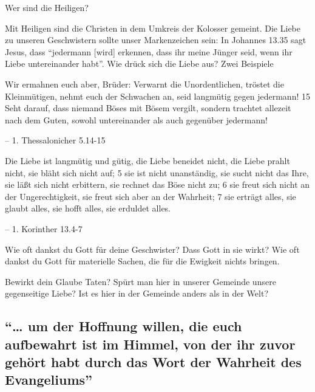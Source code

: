 \documentclass[
  12pt,
]{krantz}
\makeatletter
\newenvironment{kframe}{%
\medskip{}
\setlength{\fboxsep}{.8em}
 \def\at@end@of@kframe{}%
 \ifinner\ifhmode%
  \def\at@end@of@kframe{\end{minipage}}%
  \begin{minipage}{\columnwidth}%
 \fi\fi%
 \def\FrameCommand##1{\hskip\@totalleftmargin \hskip-\fboxsep
 \colorbox{shadecolor}{##1}\hskip-\fboxsep
     \hskip-\linewidth \hskip-\@totalleftmargin \hskip\columnwidth}%
 \MakeFramed {\advance\hsize-\width
   \@totalleftmargin\z@ \linewidth\hsize
   \@setminipage}}%
 {\par\unskip\endMakeFramed%
 \at@end@of@kframe}
\newenvironment{rmdblock}[1]
  {
  \begin{itemize}
  \renewcommand{\labelitemi}{
    \raisebox{-.7\height}[0pt][0pt]{
      {\setkeys{Gin}{width=3em,keepaspectratio}\texttt{[image: img/\#1]}}
    }
  }
  \setlength{\fboxsep}{1em}
  \begin{kframe}
  \item
  }
  {
  \end{kframe}
  \end{itemize}
  }
\newenvironment{rmdquestion}
  {\begin{rmdblock}{question}}
  {\end{rmdblock}}
\newenvironment{rmdquote}
  {\begin{rmdblock}{quote}}
  {\end{rmdblock}}
\makeatother
\begin{document}
Wer sind die Heiligen?

Mit Heiligen sind die Christen in dem Umkreis der Kolosser gemeint. Die Liebe zu unseren Geschwistern sollte unser Markenzeichen sein: In Johannes 13.35 sagt Jesus, dass ``jedermann {[}wird{]} erkennen, dass ihr meine Jünger seid, wenn ihr Liebe untereinander habt''. Wie drück sich die Liebe aus? Zwei Beispiele

\begin{rmdquote}
Wir ermahnen euch aber, Brüder: Verwarnt die Unordentlichen, tröstet die
Kleinmütigen, nehmt euch der Schwachen an, seid langmütig gegen
jedermann! 15 Seht darauf, dass niemand Böses mit Bösem vergilt, sondern
trachtet allezeit nach dem Guten, sowohl untereinander als auch
gegenüber jedermann!

-- 1. Thessalonicher 5.14-15
\end{rmdquote}

\begin{rmdquote}
Die Liebe ist langmütig und gütig, die Liebe beneidet nicht, die Liebe
prahlt nicht, sie bläht sich nicht auf; 5 sie ist nicht unanständig, sie
sucht nicht das Ihre, sie läßt sich nicht erbittern, sie rechnet das
Böse nicht zu; 6 sie freut sich nicht an der Ungerechtigkeit, sie freut
sich aber an der Wahrheit; 7 sie erträgt alles, sie glaubt alles, sie
hofft alles, sie erduldet alles.

-- 1. Korinther 13.4-7
\end{rmdquote}

\begin{rmdquestion}
Wie oft dankst du Gott für deine Geschwister? Dass Gott in sie wirkt?
Wie oft dankst du Gott für materielle Sachen, die für die Ewigkeit
nichts bringen.

Bewirkt dein Glaube Taten? Spürt man hier in unserer Gemeinde unsere
gegenseitige Liebe? Ist es hier in der Gemeinde anders als in der Welt?
\end{rmdquestion}

\hypertarget{um-der-hoffnung-willen-die-euch-aufbewahrt-ist-im-himmel-von-der-ihr-zuvor-gehuxf6rt-habt-durch-das-wort-der-wahrheit-des-evangeliums}{%
\subsection{``\ldots{} um der Hoffnung willen, die euch aufbewahrt ist im Himmel, von der ihr zuvor gehört habt durch das Wort der Wahrheit des Evangeliums''}\label{um-der-hoffnung-willen-die-euch-aufbewahrt-ist-im-himmel-von-der-ihr-zuvor-gehuxf6rt-habt-durch-das-wort-der-wahrheit-des-evangeliums}}
\end{document}
